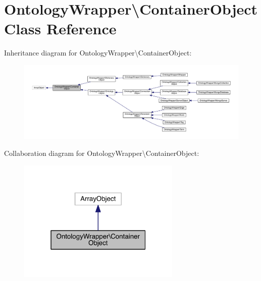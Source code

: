 \hypertarget{class_ontology_wrapper_1_1_container_object}{\section{Ontology\-Wrapper\textbackslash{}Container\-Object Class Reference}
\label{class_ontology_wrapper_1_1_container_object}
}


Inheritance diagram for Ontology\-Wrapper\textbackslash{}Container\-Object\-:
\nopagebreak
\begin{figure}[H]
\begin{center}
\leavevmode
\includegraphics[width=350pt]{class_ontology_wrapper_1_1_container_object__inherit__graph}
\end{center}
\end{figure}


Collaboration diagram for Ontology\-Wrapper\textbackslash{}Container\-Object\-:\nopagebreak
\begin{figure}[H]
\begin{center}
\leavevmode
\includegraphics[width=220pt]{class_ontology_wrapper_1_1_container_object__coll__graph}
\end{center}
\end{figure}
